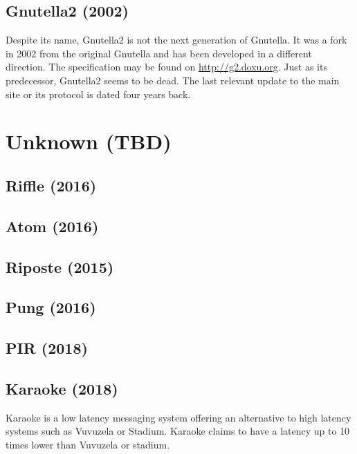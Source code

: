 \subsection{Gnutella2 (2002)}
Despite its name, Gnutella2 is not the next generation of Gnutella. It was a fork in 2002 from the original Gnutella and has been developed in a different direction. The specification may be found on \url{http://g2.doxu.org}. Just as its predecessor, Gnutella2 seems to be dead. The last relevant update to the main site or its protocol is dated four years back.

\section{Unknown (TBD)}
\subsection{Riffle (2016)}
\cite{kwon2016riffle}

%

\subsection{Atom (2016)}
\cite{kwon2016atom}

%

\subsection{Riposte (2015)}
\cite{corrigan2015riposte}

%

\subsection{Pung (2016)}
\cite{angel2016unobservable}

%

\subsection{PIR (2018)}
\cite{angel2018pir}

%

\subsection{Karaoke (2018)}
Karaoke\cite{lazar2018karaoke} is a low latency messaging system offering an alternative to high latency systems such as Vuvuzela or Stadium. Karaoke claims to have a latency up to 10 times lower than Vuvuzela or stadium.

